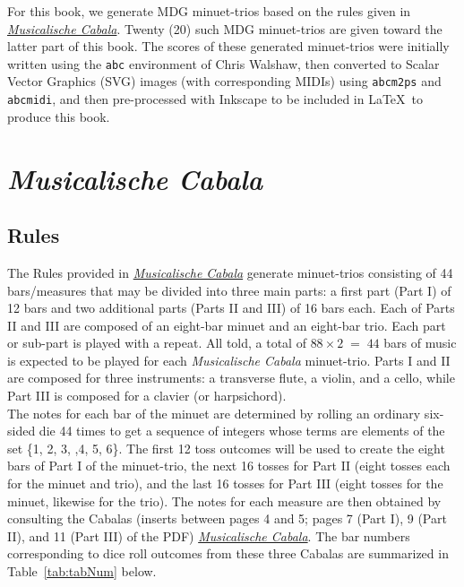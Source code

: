 \documentclass[a4paper,x11names,svgnames,10pt]{article}
\begin{document}
{For this book, we generate MDG minuet-trios based on the rules given in \href{https://imslp.org/wiki/Musicalische_Cabala_(Schola\%2C_Franciscus)}{{\em Musicalische Cabala}}. Twenty (20) such MDG minuet-trios are given toward the latter part of this book. The scores of these generated minuet-trios were initially written using the \texttt{abc} environment of Chris Walshaw, then converted to Scalar Vector Graphics (SVG) images (with corresponding MIDIs) using {\tt abcm2ps} and {\tt abcmidi}, and then pre-processed with Inkscape to be included in \LaTeX\ to produce this book.


\section{\em Musicalische Cabala}

\subsection{Rules}\label{mdgRules}

The Rules provided in \href{https://imslp.org/wiki/Musicalische_Cabala_(Schola\%2C_Franciscus)}{{\em Musicalische Cabala}} generate minuet-trios consisting of 44 bars/measures that may be divided into three main parts: a first part (Part I) of 12 bars and two additional parts (Parts II and III) of 16 bars each. Each of  Parts II and III are composed of an eight-bar minuet and an eight-bar trio.  Each part or sub-part is played with a repeat. All told, a total of $88 \times 2 \;=\; 44$ bars of music is expected to be played for each {\it Musicalische Cabala} minuet-trio. Parts I and II are composed for three instruments: a transverse flute, a violin, and a cello, while Part III is composed for a clavier (or harpsichord).\\

The notes for each bar of the minuet are determined by rolling an ordinary six-sided die 44 times to get a sequence of integers whose terms are elements of the set \{1, 2, 3, ,4, 5, 6\}. The first 12 toss outcomes will be used to create the eight bars of Part I of the minuet-trio, the next 16 tosses for Part II (eight tosses each for the minuet and trio), and the last 16 tosses for Part III (eight tosses for the minuet, likewise for the trio). The notes for each measure are then obtained by consulting the Cabalas (inserts between pages 4 and 5; pages 7 (Part I), 9 (Part II), and 11 (Part III) of the PDF) \href{https://imslp.org/wiki/Musicalische_Cabala_(Schola\%2C_Franciscus)}{{\em Musicalische Cabala}}. The bar numbers corresponding to dice roll outcomes from these three Cabalas are summarized in Table~\ref{tab:tabNum} below.

}
\end{document}
